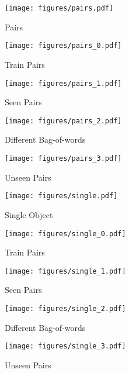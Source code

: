 \begin{figure*}[ht]
\centering
    \begin{subfigure}[b]{0.15\textwidth}
        \centering    \texttt{[image: figures/pairs.pdf]}
        \caption{\tiny{} Pairs  }
    \end{subfigure}%
    \begin{subfigure}[b]{0.2\textwidth}
        \centering    \texttt{[image: figures/pairs\_0.pdf]}
        \caption{\tiny{} Train Pairs}
    \end{subfigure}%
    \hfill
    \begin{subfigure}[b]{0.2\textwidth}
        \centering    \texttt{[image: figures/pairs\_1.pdf]}
        \caption{\tiny{} Seen Pairs}
    \end{subfigure}%
    \hfill
    \begin{subfigure}[b]{0.2\textwidth}
        \centering    \texttt{[image: figures/pairs\_2.pdf]}
        \caption{\tiny{} Different Bag-of-words}
    \end{subfigure}%
    \hfill
    \begin{subfigure}[b]{0.2\textwidth}
        \centering    \texttt{[image: figures/pairs\_3.pdf]}
        \caption{\tiny{} Unseen Pairs}
    \end{subfigure}%

    \begin{subfigure}[b]{0.15\textwidth}
        \centering    \texttt{[image: figures/single.pdf]}
        \caption{\tiny{} Single Object }
    \end{subfigure}%
    \begin{subfigure}[b]{0.2\textwidth}
        \centering    \texttt{[image: figures/single\_0.pdf]}
        \caption{\tiny{} Train Pairs}
    \end{subfigure}%
    \hfill
    \begin{subfigure}[b]{0.2\textwidth}
        \centering    \texttt{[image: figures/single\_1.pdf]}
        \caption{\tiny{} Seen Pairs}
    \end{subfigure}%
    \hfill
    \begin{subfigure}[b]{0.2\textwidth}
        \centering    \texttt{[image: figures/single\_2.pdf]}
        \caption{\tiny{} Different Bag-of-words}
    \end{subfigure}%
    \hfill
    \begin{subfigure}[b]{0.2\textwidth}
        \centering    \texttt{[image: figures/single\_3.pdf]}
        \caption{\tiny{} Unseen Pairs}
    \end{subfigure}%
  


\end{figure*}
